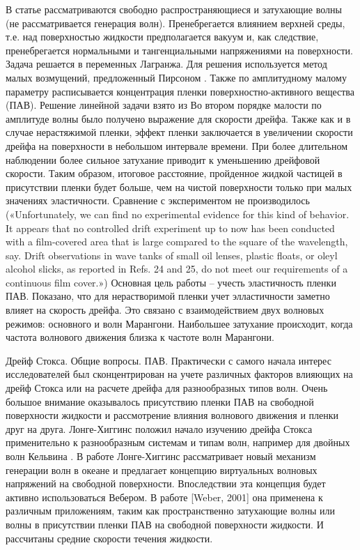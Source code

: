 В статье рассматриваются свободно распространяющиеся и затухающие волны (не рассматривается генерация волн). Пренебрегается влиянием верхней среды, т.е. над поверхностью жидкости предполагается вакуум и, как следствие, пренебрегается нормальными и тангенциальными напряжениями на поверхности. Задача решается в переменных Лагранжа. Для решения используется метод малых возмущений, предложенный Пирсоном \cite{pierson1962perturbation}. Также по амплитудному малому параметру расписывается концентрация пленки поверхностно-активного вещества (ПАВ). Решение линейной задачи взято из \cite{weber1993transient} 
Во втором порядке малости по амплитуде волны было получено выражение для скорости дрейфа. Также как и в случае нерастяжимой пленки, эффект пленки заключается в увеличении скорости дрейфа на поверхности в небольшом интервале времени. При более длительном наблюдении более сильное затухание приводит к уменьшению дрейфовой скорости. Таким образом, итоговое расстояние, пройденное жидкой частицей в присутствии пленки будет больше, чем на чистой поверхности только при малых значениях эластичности. 
Сравнение с экспериментом не производилось («Unfortunately, we can find no experimental evidence for this kind of behavior. It appears that no controlled drift experiment up to now has been conducted with a film-covered area that is large compared to the square of the wavelength, say. Drift observations in wave tanks of small oil lenses, plastic floats, or oleyl alcohol slicks, as reported in Refs. 24 and 25, do not meet our requirements of a continuous film cover.»)
Основная цель работы – учесть эластичность пленки ПАВ. Показано, что для нерастворимой пленки учет элластичности заметно влияет на скорость дрейфа. Это связано с взаимодействием двух волновых режимов: основного и волн Марангони. Наибольшее затухание происходит, когда частота волнового движения близка к частоте волн Марангони.






Дрейф Стокса. Общие вопросы. ПАВ.
Практически с самого начала интерес исследователей был сконцентрирован на учете различных факторов влияющих на дрейф Стокса или на расчете дрейфа для разнообразных типов волн. Очень большое внимание оказывалось присутствию пленки ПАВ на свободной поверхности жидкости и рассмотрение влияния волнового движения и пленки друг на друга. Лонге-Хиггинс положил начало изучению дрейфа Стокса применительно к разнообразным системам и типам волн, например для двойных волн Кельвина \cite{longuet1969transport}.
В работе \cite{longuet1969wave} Лонге-Хиггинс рассматривает новый механизм генерации волн в океане и предлагает концепцию виртуальных волновых напряжений на свободной поверхности. 
Впоследствии эта концепция будет активно использоваться Вебером. В работе [Weber, 2001] она применена к различным приложениям, таким как пространственно затухающие волны или волны в присутствии пленки ПАВ на свободной поверхности жидкости. И рассчитаны средние скорости течения жидкости.

